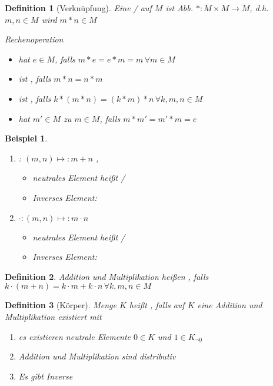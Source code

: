 \documentclass[ngerman,a4paper]{report}
\theoremstyle{break}
\newtheorem*{*example}{Beispiel}
\newtheorem*{definition}{Definition}
\begin{document}
\begin{definition}[Verknüpfung]
	Eine  /  auf $M$ ist Abb. $*:M\times M\rightarrow M$, d.h. $m,n\in M$ wird  $m*n\in M$
	
	Rechenoperation
	\begin{itemize}
		\item hat  $e\in M$, falls $m*e = e*m = m\,\forall m\in M$
		\item ist , falls $m*n = n*m$
		\item ist , falls $k*(m*n) = (k*m)*n\,\forall k,m,n\in M$
		\item hat  $m'\in M$ zu $m\in M$, falls $m*m' = m'*m = e$
	\end{itemize}
\end{definition}

\begin{*example}
	\begin{enumerate}[label={\alph*)}]
		\item {}: $(m,n)\mapsto: m+n$ ,
		\begin{itemize}
			\item neutrales Element heißt  / 
			\item Inverses Element: 
		\end{itemize}
		\item {} $\cdot:(m,n)\mapsto: m\cdot n$ 
		\begin{itemize}
			\item neutrales Element heißt  / 
			\item Inverses Element:
		\end{itemize}
	\end{enumerate}
\end{*example}

\begin{definition}
	Addition und Multiplikation heißen , falls $k\cdot(m+n) = k\cdot m + k\cdot n\,\forall k,m,n\in M$
\end{definition}

\begin{definition}[Körper]
	Menge $K$ heißt , falls auf $K$ eine Addition und Multiplikation existiert mit
	\begin{enumerate}[label={\alph*}]
		\item es existieren neutrale Elemente $0\in K$ und $1\in K_{\neg 0}$
		\item Addition und Multiplikation sind distributiv
		\item Es gibt Inverse
	\end{enumerate}
\end{definition}
\end{document}
